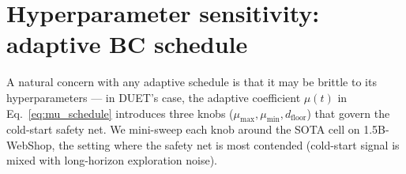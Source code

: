 
\section{Hyperparameter sensitivity: adaptive BC schedule}
\label{app:sensitivity}

A natural concern with any adaptive schedule is that it may be brittle to its hyperparameters --- in DUET's case, the adaptive coefficient $\mu(t)$ in Eq.~\eqref{eq:mu_schedule} introduces three knobs ($\mu_{\max}, \mu_{\min}, d_{\text{floor}}$) that govern the cold-start safety net. We mini-sweep each knob around the SOTA cell on 1.5B-WebShop, the setting where the safety net is most contended (cold-start signal is mixed with long-horizon exploration noise).


